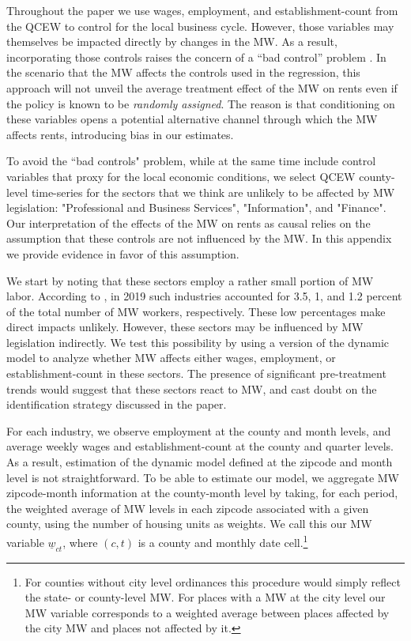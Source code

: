 Throughout the paper we use wages, employment, and establishment-count from the QCEW to control 
for the local business cycle. However, those variables may themselves be impacted directly by 
changes in the MW. As a result, incorporating those controls raises the concern of a ``bad 
control'' problem \parencite{AngristPischke2009}. In the scenario that the MW affects the 
controls used in the regression, this approach will not unveil the average treatment effect of 
the MW on rents even if the policy is known to be \textit{randomly assigned}. The reason is 
that conditioning on these variables opens a potential alternative channel through which the MW 
affects rents, introducing bias in our estimates.

To avoid the ``bad controls" problem, while at the same time include control variables that 
proxy for the local economic conditions, we select QCEW county-level time-series for the sectors 
that we think are unlikely to be affected by MW legislation: "Professional and Business Services", 
"Information", and "Finance". Our interpretation of the effects of the MW on rents as causal 
relies on the assumption that these controls are not influenced by the MW. In this appendix we 
provide evidence in favor of this assumption.

We start by noting that these sectors employ a rather small portion of MW labor. According to 
\textcite[][table 5]{MinWorkersReportBLS}, in 2019 such industries accounted for 3.5, 1, and 
1.2 percent of the total number of MW workers, respectively. These low percentages make direct
impacts unlikely. However, these sectors may be influenced by MW legislation indirectly. We 
test this possibility by using a version of the dynamic model to analyze whether MW affects 
either wages, employment, or establishment-count in these sectors. The presence of significant 
pre-treatment trends would suggest that these sectors react to MW, and cast doubt on the 
identification strategy discussed in the paper.

For each industry, we observe employment at the county and month levels, and average weekly 
wages and establishment-count at the county and quarter levels. As a result, estimation of the 
dynamic model defined at the zipcode and month level is not straightforward. To be able to 
estimate our model, we aggregate MW zipcode-month information at the county-month level by 
taking, for each period, the weighted average of MW levels in each zipcode associated with a 
given county, using the number of housing units as weights. We call this our MW variable 
$\underline{w}_{ct}$, where $(c, t)$ is a county and monthly date cell.\footnote{For counties 
	without city level ordinances this procedure would simply reflect the state- or 
	county-level 	MW. For places with a MW at the city level our MW variable corresponds to a 
	weighted average between places affected by the city MW and places not affected by it.}

